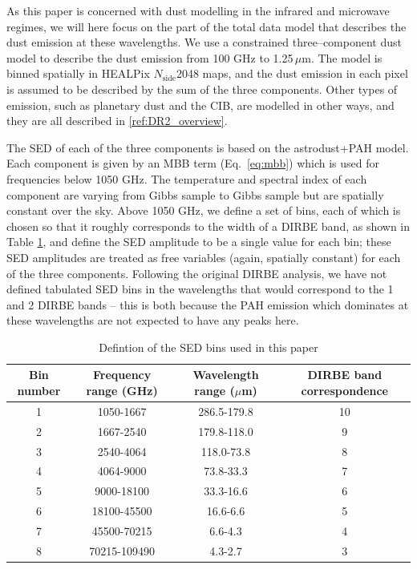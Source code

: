 \documentclass{aa}
\def\nside{$N_{\mathrm{side}}$}
\begin{document}
As this paper is concerned with dust modelling in the infrared and microwave regimes, we will here focus on the part of the total data model that describes the dust emission at these wavelengths. We use a constrained three--component dust model to describe the dust emission from 100 GHz to 1.25\,$\mu$m. The model is binned spatially in HEALPix \nside 2048 maps, and the dust emission in each pixel is assumed to be described by the sum of the three components. Other types of emission, such as planetary dust and the CIB, are modelled in other ways, and they are all described in \ref{ref:DR2_overview}.

The SED of each of the three components is based on the astrodust+PAH model. Each component is given by an MBB term (Eq.~\eqref{eq:mbb}) which is used for frequencies below 1050 GHz. The temperature and spectral index of each component are varying from Gibbs sample to Gibbs sample but are spatially constant over the sky. Above 1050 GHz, we define a set of bins, each of which is chosen so that it roughly corresponds to the width of a DIRBE band, as shown in Table \ref{tab:bins}, and define the SED amplitude to be a single value for each bin; these SED amplitudes are treated as free variables (again, spatially constant) for each of the three components. Following the original DIRBE analysis, we have not defined tabulated SED bins in the wavelengths that would correspond to the 1 and 2 DIRBE bands -- this is both because the PAH emission which dominates at these wavelengths are not expected to have any peaks here.

\begin{table}
    \label{tab:bins}
    \centering
    \caption{Defintion of the SED bins used in this paper}
    \begin{tabular}{c|c|c|c}
        Bin number & Frequency range (GHz) & Wavelength range ($\mu$m) & DIRBE band correspondence \\
        \hline
        1 & 1050-1667 & 286.5-179.8 & 10 \\
        2 & 1667-2540 & 179.8-118.0 & 9 \\
        3 & 2540-4064 & 118.0-73.8 & 8 \\
        4 & 4064-9000 & 73.8-33.3 & 7 \\
        5 & 9000-18100 & 33.3-16.6 & 6 \\
        6 & 18100-45500 & 16.6-6.6 & 5  \\
        7 & 45500-70215 & 6.6-4.3 & 4 \\
        8 & 70215-109490 & 4.3-2.7 & 3
    \end{tabular}
\end{table}
\end{document}
